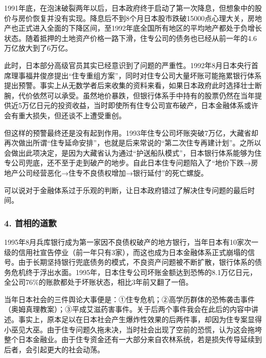 {\fangsong 1991年底，在泡沫破裂两年以后，日本政府终于启动了第一次降息，但想象中的股价与房价恢复并没有实现。降息后不到8个月日本股市跌破15000点心理大关，房地产也正式进入全面的下降区间，至1992年底全国所有地区的平均地产都处于负增长状态。随着抵押的土地资产价格一路下滑，住专公司的债务也已经从前一年的4.6万亿放大到了6万亿。\par}

{\fangsong 此时，日本部分高级官员其实已经意识到了问题的严重性。1992年8月日本央行首席理事福井俊彦提出“住专重组方案”，同时对住专公司大量坏账可能拖累银行体系提出预警。事实上从无数学者后来收集的资料来看，如果日本政府此时选择壮士断腕，代价依然可以承受。虽然地价暴跌，但银行体系手中持有的股票仍然在当年提供近5万亿日元的投资收益，当时即使所有住专公司宣布破产，日本金融体系或许会有重大损失，但还谈不上遭受重创。\par}

{\fangsong 但这样的预警最终还是没有起到作用。1993年住专公司坏账突破7万亿，大藏省却再次做出所谓“住专延命安排”，也就是后来常说的“第二次住专再建计划”。之所以会做出此项决定，是因为大藏省认为通过“护送船队模式”，日本银行体系能够为住专公司兜底，还不至于走到破产的地步。自此日本住专问题陷入了“地价下跌→房地产公司经营恶化→住专不良债权增加→银行延付”的死亡螺旋。\par}

{\fangsong 可以说对于金融体系过于乐观的判断，让日本政府错过了解决住专问题的最后时间。\par}

\subsubsection{4. 首相的道歉}

{\fangsong 1995年8月兵库银行成为第一家因不良债权破产的地方银行，当年日本有10家次一级的信用社宣告停业（前一年只有3家），而这也成为日本金融体系正式崩塌的信号。由于长期坚持银行兜底债务的模式，不良资产问题被不断扩散，银行体系的债务危机终于浮出水面。1995年，日本住专公司坏账金额达到恐怖的8.1万亿日元，全公司76\%的账款都处于坏账状态，相比3年前又翻了一倍。\par}

{\fangsong 当年日本社会的三件舆论大事便是：①住专危机；②高学历群体的恐怖袭击事件（奥姆真理教案）；③平成艾滋药害事件。关于后两个事件我会在此后的内容中讲述。事实上，原本足以在日本社会产生爆炸性效果的后两件事，却因为住专案显得小巫见大巫。由于住专问题久拖未决，当时社会出现了空前的恐慌，认为这会拖垮整个日本金融业。由于住专资金还有一大部分来自农林系统，若是损失传导延续到后者，会引起更大的社会动荡。\par}

